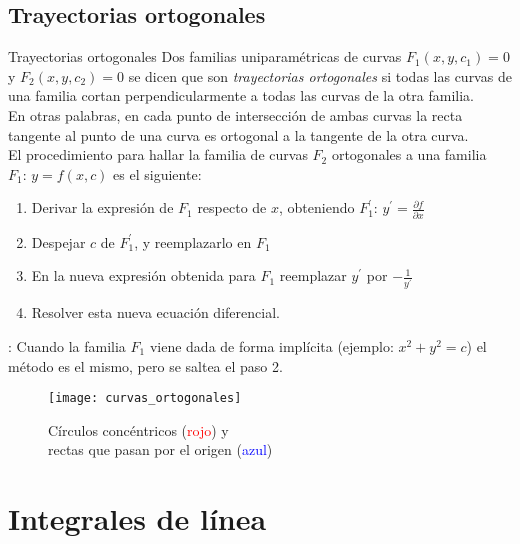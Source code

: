 \documentclass[a4paper, twoside]{article}
\numberwithin{equation}{section}
\numberwithin{figure}{section}
\numberwithin{table}{section}
\begin{document}
\subsection{Trayectorias ortogonales}
\begin{minipage}{0.6\textwidth}
	\begin{definicion*}{Trayectorias ortogonales}
		Dos familias uniparamétricas de curvas $F_1(x,y,c_1)=0$ y $F_2(x,y,c_2)=0$ se dicen que son \emph{trayectorias ortogonales} si todas las curvas de una familia cortan perpendicularmente a todas las curvas de la otra familia.\\
		
		En otras palabras, en cada punto de intersección de ambas curvas la recta tangente al punto de una curva es ortogonal a la tangente de la otra curva.\\
		
		El procedimiento para hallar la familia de curvas $F_2$ ortogonales a una familia $F_1:\, y=f(x,c)$ es el siguiente:
		\begin{enumerate}
			\item Derivar la expresión de $F_1$ respecto de $x$, obteniendo $F_1^\prime:\, y^\prime=\frac{\partial f}{\partial x}$
			\item Despejar $c$ de $F_1^\prime$, y reemplazarlo en $F_1$
			\item En la nueva expresión obtenida para $F_1$ reemplazar $y^\prime$ por $-\frac{1}{y^\prime}$
			\item Resolver esta nueva ecuación diferencial.
		\end{enumerate}
		
		: {\footnotesize Cuando la familia $F_1$ viene dada de forma implícita (ejemplo: $x^2+y^2=c$) el método es el mismo, pero se saltea	el paso 2.}
	\end{definicion*}
\end{minipage}
\begin{minipage}{0.4\textwidth}
	\begin{figure}[H]
		\centering
		\texttt{[image: curvas\_ortogonales]}
		\caption{{\scriptsize Círculos concéntricos (\textcolor{red}{rojo}) y \\ rectas que pasan por el origen (\textcolor{blue}{azul})}}
	\end{figure}
\end{minipage}

\newpage
\section{Integrales de línea}
\end{document}
